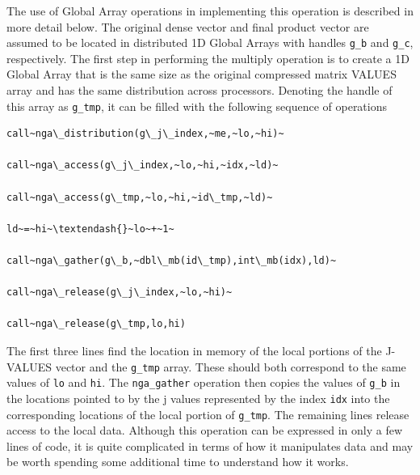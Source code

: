The use of Global Array operations in implementing this operation
is described in more detail below. The original dense vector and final
product vector are assumed to be located in distributed 1D Global
Arrays with handles \texttt{g\_b} and \texttt{g\_c}, respectively.
The first step in performing the multiply operation is to create a
1D Global Array that is the same size as the original compressed matrix
VALUES array and has the same distribution across processors. Denoting
the handle of this array as \texttt{g\_tmp}, it can be filled with
the following sequence of operations
\begin{verbatim}
call~nga\_distribution(g\_j\_index,~me,~lo,~hi)~

call~nga\_access(g\_j\_index,~lo,~hi,~idx,~ld)~

call~nga\_access(g\_tmp,~lo,~hi,~id\_tmp,~ld)~

ld~=~hi~\textendash{}~lo~+~1~

call~nga\_gather(g\_b,~dbl\_mb(id\_tmp),int\_mb(idx),ld)~

call~nga\_release(g\_j\_index,~lo,~hi)~

call~nga\_release(g\_tmp,lo,hi)
\end{verbatim}
The first three lines find the location in memory of the local portions
of the J-VALUES vector and the \texttt{g\_tmp} array. These should
both correspond to the same values of \texttt{lo} and \texttt{hi}.
The \texttt{nga\_gather} operation then copies the values of \texttt{g\_b}
in the locations pointed to by the j values represented by the index
\texttt{idx} into the corresponding locations of the local portion
of \texttt{g\_tmp}. The remaining lines release access to the local
data. Although this operation can be expressed in only a few lines
of code, it is quite complicated in terms of how it manipulates data
and may be worth spending some additional time to understand how it
works.

